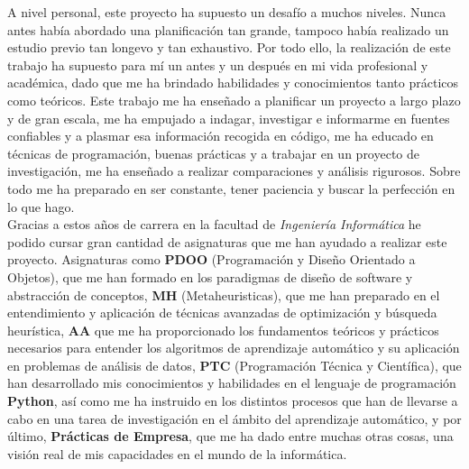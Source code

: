 A nivel personal, este proyecto ha supuesto un desafío a muchos niveles. Nunca antes había abordado una planificación tan grande, tampoco había realizado un estudio previo tan longevo y tan exhaustivo. Por todo ello, la realización de este trabajo ha supuesto para mí un antes y un después en mi vida profesional y académica, dado que me ha brindado habilidades y conocimientos tanto prácticos como teóricos. Este trabajo me ha enseñado a planificar un proyecto a largo plazo y de gran escala, me ha empujado a indagar, investigar e informarme en fuentes confiables y a plasmar esa información recogida en código, me ha educado en técnicas de programación, buenas prácticas y a trabajar en un proyecto de investigación, me ha enseñado a realizar comparaciones y análisis rigurosos. Sobre todo me ha preparado en ser constante, tener paciencia y buscar la perfección en lo que hago.\\[6pt]
Gracias a estos años de carrera en la facultad de \textit{Ingeniería Informática} he podido cursar gran cantidad de asignaturas que me han ayudado a realizar este proyecto. Asignaturas como \textbf{PDOO} (Programación y Diseño Orientado a Objetos), que me han formado en los paradigmas de diseño de software y abstracción de conceptos, \textbf{MH} (Metaheuristicas), que me han preparado en el entendimiento y aplicación de técnicas avanzadas de optimización y búsqueda heurística, \textbf{AA} que me ha proporcionado los fundamentos teóricos y prácticos necesarios para entender los algoritmos de aprendizaje automático y su aplicación en problemas de análisis de datos, \textbf{PTC} (Programación Técnica y Científica), que han desarrollado mis conocimientos y habilidades en el lenguaje de programación \textbf{Python}, así como me ha instruido en los distintos procesos que han de llevarse a cabo en una tarea de investigación en el ámbito del aprendizaje automático, y por último, \textbf{Prácticas de Empresa}, que me ha dado entre muchas otras cosas, una visión real de mis capacidades en el mundo de la informática.
